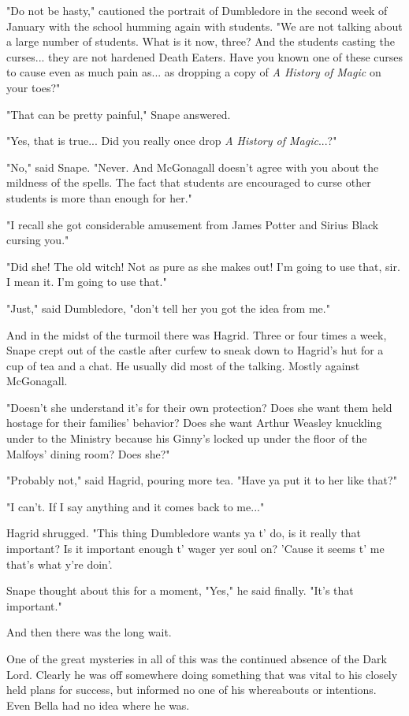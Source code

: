 "Do not be hasty," cautioned the portrait of Dumbledore in the second week of January with the school humming again with students. "We are not talking about a large number of students. What is it now, three? And the students casting the curses... they are not hardened Death Eaters. Have you known one of these curses to cause even as much pain as... as dropping a copy of \emph{A History of Magic} on your toes?"

"That can be pretty painful," Snape answered.

"Yes, that is true... Did you really once drop \emph{A History of Magic}...?"

"No," said Snape. "Never. And McGonagall doesn't agree with you about the mildness of the spells. The fact that students are encouraged to curse other students is more than enough for her."

"I recall she got considerable amusement from James Potter and Sirius Black cursing you."

"Did she! The old witch! Not as pure as she makes out! I'm going to use that, sir. I mean it. I'm going to use that."

"Just," said Dumbledore, "don't tell her you got the idea from me."

And in the midst of the turmoil there was Hagrid. Three or four times a week, Snape crept out of the castle after curfew to sneak down to Hagrid's hut for a cup of tea and a chat. He usually did most of the talking. Mostly against McGonagall.

"Doesn't she understand it's for their own protection? Does she want them held hostage for their families' behavior? Does she want Arthur Weasley knuckling under to the Ministry because his Ginny's locked up under the floor of the Malfoys' dining room? Does she?"

"Probably not," said Hagrid, pouring more tea. "Have ya put it to her like that?"

"I can't. If I say anything and it comes back to me..."

Hagrid shrugged. "This thing Dumbledore wants ya t' do, is it really that important? Is it important enough t' wager yer soul on? 'Cause it seems t' me that's what y're doin'.

Snape thought about this for a moment, "Yes," he said finally. "It's that important."

And then there was the long wait.

One of the great mysteries in all of this was the continued absence of the Dark Lord. Clearly he was off somewhere doing something that was vital to his closely held plans for success, but informed no one of his whereabouts or intentions. Even Bella had no idea where he was.

